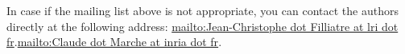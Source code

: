 \documentclass[a4paper,11pt,twoside,openright]{report}
\begin{document}
In case if the mailing list above is not appropriate, you can contact
the authors directly at the following address: \url{mailto:Jean-Christophe dot
  Filliatre at lri dot fr}.\url{mailto:Claude dot
  Marche at inria dot fr}.

\cleardoublepage



\cleardoublepage

\printindex
\cleardoublepage
\end{document}
